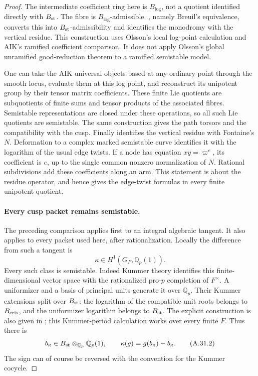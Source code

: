 \begin{proof}
The intermediate coefficient ring here is
\(B_{\log}\), not a quotient identified
directly with \(B_{\rm st}\).
The fibre is \(B_{\log}\)-admissible.
\cite[Proposition 2.1]{fghAIK}, namely
Breuil's equivalence, converts this into
\(B_{\rm st}\)-admissibility and identifies
the monodromy with the vertical residue.
This construction uses Olsson's local
log-point calculation and AIK's ramified
coefficient comparison. It does not apply
Olsson's global unramified good-reduction
theorem to a ramified semistable model.

One can take the AIK universal objects based at any ordinary
point through the smooth locus, evaluate them at this log
point, and reconstruct its unipotent group by their tensor
matrix coefficients. These finite Lie quotients are subquotients
of finite sums and tensor products of the associated fibres.
Semistable representations are closed under these operations,
so all such Lie quotients are semistable. The same construction gives the
path torsors and the compatibility with the cusp.
Finally \cite[Lemma 6.2(ii) and the deformation argument in
Section 6.2]{fghAIK} identifies the vertical residue with
Fontaine's \(N\). Deformation to a complex marked semistable
curve identifies it with the logarithm of the usual edge
twists. If a node has equation \(xy=\varpi^e\), its
coefficient is \(e\), up to the single common nonzero
normalization of \(N\). Rational subdivisions add these
coefficients along an arm. This statement is about the
residue operator, and hence gives the edge-twist formulas
in every finite unipotent quotient.

\paragraph{Every cusp packet remains semistable.}
The preceding comparison applies first to an integral
algebraic tangent. It also applies to every packet used
here, after rationalization. Locally the difference from
such a tangent is
\[
                  \kappa\in H^1(G_F,\mathbb Q_p(1)).
\]
Every such class is semistable. Indeed Kummer theory identifies
this finite-dimensional vector space with the rationalized
pro-\(p\) completion of \(F^\times\). A uniformizer and a
basis of principal units generate it over \(\mathbb Q_p\).
Their Kummer extensions split over \(B_{\rm st}\):
the logarithm of the compatible unit roots belongs to
\(B_{\rm cris}\), and the uniformizer logarithm belongs to
\(B_{\rm st}\). The explicit construction is also given in
\cite[Sections 11.7--11.10]{fghOlssonSemistable}; this
Kummer-period calculation works over every finite \(F\).
Thus there is
\[
 b_\kappa\in B_{\rm st}\otimes_{\mathbb Q_p}\mathbb Q_p(1),
 \qquad
                 \kappa(g)=g(b_\kappa)-b_\kappa .
                                                        \tag{A.31.2}
\]
The sign can of course be reversed with the convention for
the Kummer cocycle.


\end{proof}

